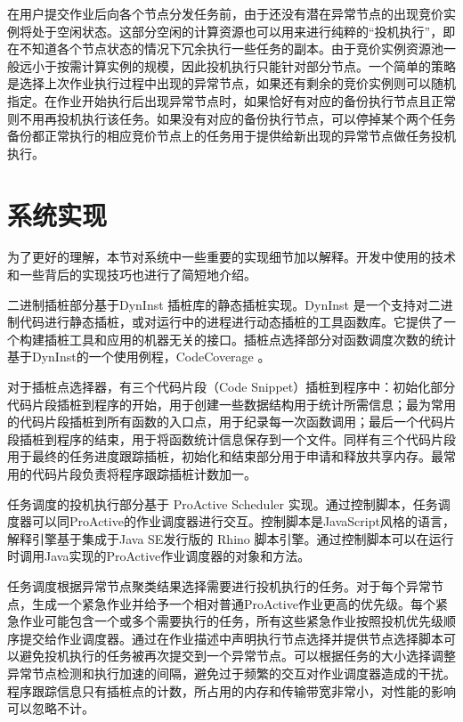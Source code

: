 在用户提交作业后向各个节点分发任务前，由于还没有潜在异常节点的出现竞价实例将处于空闲状态。这部分空闲的计算资源也可以用来进行纯粹的``投机执行''，即在不知道各个节点状态的情况下冗余执行一些任务的副本。由于竞价实例资源池一般远小于按需计算实例的规模，因此投机执行只能针对部分节点。一个简单的策略是选择上次作业执行过程中出现的异常节点，如果还有剩余的竞价实例则可以随机指定。在作业开始执行后出现异常节点时，如果恰好有对应的备份执行节点且正常则不用再投机执行该任务。如果没有对应的备份执行节点，可以停掉某个两个任务备份都正常执行的相应竞价节点上的任务用于提供给新出现的异常节点做任务投机执行。

\section{系统实现}
\label{subsec:no2_impl}
为了更好的理解，本节对系统中一些重要的实现细节加以解释。开发中使用的技术和一些背后的实现技巧也进行了简短地介绍。

二进制插桩部分基于DynInst \cite{Dyninst-Deconstruction} 插桩库的静态插桩实现。DynInst 是一个支持对二进制代码进行静态插桩，或对运行中的进程进行动态插桩的工具函数库。它提供了一个构建插桩工具和应用的机器无关的接口。插桩点选择部分对函数调度次数的统计基于DynInst的一个使用例程，CodeCoverage \cite{codecoverage}。
	
对于插桩点选择器，有三个代码片段（Code Snippet）插桩到程序中：初始化部分代码片段插桩到程序的开始，用于创建一些数据结构用于统计所需信息；最为常用的代码片段插桩到所有函数的入口点，用于纪录每一次函数调用；最后一个代码片段插桩到程序的结束，用于将函数统计信息保存到一个文件。同样有三个代码片段用于最终的任务进度跟踪插桩，初始化和结束部分用于申请和释放共享内存。最常用的代码片段负责将程序跟踪插桩计数加一。

任务调度的投机执行部分基于 ProActive Scheduler \cite{pascheduling} 实现。通过控制脚本，任务调度器可以同ProActive的作业调度器进行交互。控制脚本是JavaScript风格的语言，解释引擎基于集成于Java SE发行版的 Rhino \cite{Rhino:2016} 脚本引擎。通过控制脚本可以在运行时调用Java实现的ProActive作业调度器的对象和方法。

任务调度根据异常节点聚类结果选择需要进行投机执行的任务。对于每个异常节点，生成一个紧急作业并给予一个相对普通ProActive作业更高的优先级。每个紧急作业可能包含一个或多个需要执行的任务，所有这些紧急作业按照投机优先级顺序提交给作业调度器。通过在作业描述中声明执行节点选择并提供节点选择脚本可以避免投机执行的任务被再次提交到一个异常节点。可以根据任务的大小选择调整异常节点检测和执行加速的间隔，避免过于频繁的交互对作业调度器造成的干扰。程序跟踪信息只有插桩点的计数，所占用的内存和传输带宽非常小，对性能的影响可以忽略不计。

